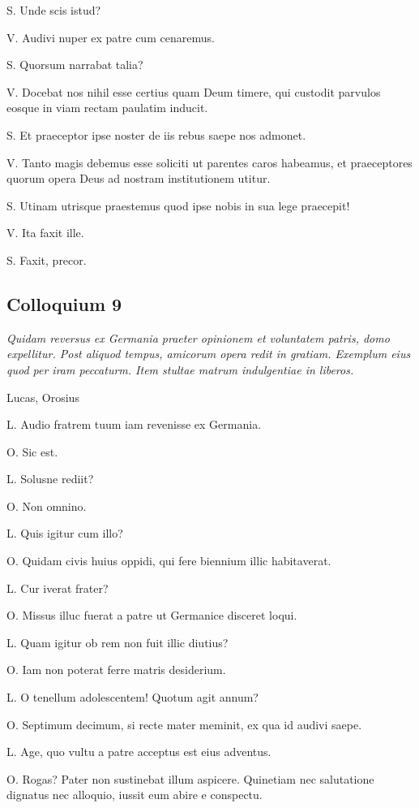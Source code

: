 \documentclass{article}
\begin{document}
S. Unde scis istud?

V. Audivi nuper ex patre cum cenaremus.

S. Quorsum narrabat talia?

V. Docebat nos nihil esse certius quam Deum timere, qui custodit parvulos eosque in viam rectam paulatim inducit.

S. Et praeceptor ipse noster de iis rebus saepe nos admonet.

V. Tanto magis debemus esse soliciti ut parentes caros habeamus, et praeceptores quorum opera Deus ad nostram institutionem utitur.

S. Utinam utrisque praestemus quod ipse nobis in sua lege praecepit!

V. Ita faxit ille.

S. Faxit, precor.

\subsection{Colloquium 9}
\emph{Quidam reversus ex Germania praeter opinionem et voluntatem patris, domo expellitur. Post aliquod tempus, amicorum opera redit in gratiam. Exemplum eius quod per iram peccaturm. Item stultae matrum indulgentiae in liberos.}

Lucas, Orosius

L. Audio fratrem tuum iam revenisse ex Germania.

O. Sic est.

L. Solusne rediit?

O. Non omnino.

L. Quis igitur cum illo?

O. Quidam civis huius oppidi, qui fere biennium illic habitaverat.

L. Cur iverat frater?

O. Missus illuc fuerat a patre ut Germanice disceret loqui.

L. Quam igitur ob rem non fuit illic diutius?

O. Iam non poterat ferre matris desiderium.

L. O tenellum adolescentem! Quotum agit annum?

O. Septimum decimum, si recte mater meminit, ex qua id audivi saepe.

L. Age, quo vultu a patre acceptus est eius adventus.

O. Rogas? Pater non sustinebat illum aspicere. Quinetiam nec salutatione dignatus nec alloquio, iussit eum abire e conspectu.
\end{document}

